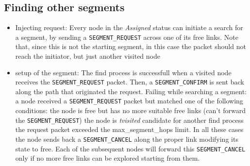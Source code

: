 \subsection{Finding other segments}

\begin{itemize}
\item{Injecting request}: Every node in the \emph{Assigned} status can initiate a search for a
segment, by sending a \texttt{SEGMENT\_REQUEST} across one of its free
links. Note that, since this is not the starting segment, in this case
the packet should not reach the initiator, but just another visited
node

\item{setup of the segment}: The find process is successfull when a visited
node receives the \texttt{SEGMENT\_REQUEST} packet. Then, a \texttt{SEGMENT\_CONFIRM} is
sent back along the path that originated the request.  Failing while
searching a segment: a node received a \texttt{SEGMENT\_REQUEST} packet but
matched one of the following conditions: the node is free but has no
more suitable free links (can’t forward the \texttt{SEGMENT\_REQUEST}) the node
is \emph{tvisited} candidate for another find process the request packet
exceeded the max\_segment\_hops limit.  In all these cases the node
sends back a \texttt{SEGMENT\_CANCEL} along the proper link modifying its state
to free. Each of the subsequent nodes will forward this \texttt{SEGMENT\_CANCEL}
only if no more free links can be explored starting from them.
\end{itemize}


